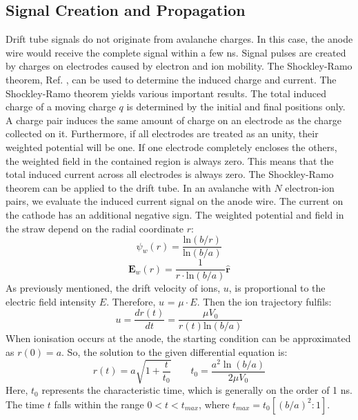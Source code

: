 \subsection{Signal Creation and Propagation}
Drift tube signals do not originate from avalanche charges. In this case, the anode wire would 
receive the complete signal within a few ns. Signal pulses are created by charges on electrodes 
caused by electron and ion mobility. The Shockley-Ramo theorem, Ref. \cite{kola}, can be 
used to determine the induced charge and current. 
The Shockley-Ramo theorem yields various important results. The total induced charge of a moving charge 
$q$ is determined by the initial and final positions only.  A charge pair induces the same amount of 
charge on an electrode as the charge collected on it. Furthermore, if all electrodes are treated as 
an unity, their weighted potential will be one. 
If one electrode completely encloses the others, the weighted field in the contained region is always zero. 
This means that the total induced current across all electrodes is always zero. The Shockley-Ramo theorem can 
be applied to the drift tube. In an avalanche with $N$ electron-ion pairs, we evaluate the induced current 
signal on the anode wire. The current on the cathode has an additional negative sign. The weighted 
potential and field in the straw depend on the radial coordinate $r$:
\begin{equation}
    \psi_w(r)=\frac{\text{ln}(b/r)}{\text{ln}(b/a)}
\end{equation}
\begin{equation}
    \textbf{E}_w(r)=\frac{1}{r \cdot \text{ln}(b/a)}\hat{\textbf{r}}
\end{equation}
As previously mentioned, the drift velocity of ions, $u$, is proportional to the electric field intensity $E$. Therefore, $u$ = $\mu \cdot E$. 
Then the ion trajectory fulfils:
\begin{equation}
    u=\frac{dr(t)}{dt}=\frac{\mu V_0}{r(t)\text{ln}(b/a)}
\end{equation}
When ionisation occurs at the anode, the starting condition can be approximated as $r(0) = a$. So, the solution to the given differential equation is:
 \begin{equation}
    r(t)=a \sqrt{1+\frac{t}{t_0}} \qquad t_0=\frac{a^2 \ln (b / a)}{2 \mu V_0}
    \end{equation}
Here, $t_0$ represents the characteristic time, which is generally on the order of 1 ns. 
The time $t$ falls within the range $0 < t < t_{max}$, where $t_{max} = t_0 [(b/a)^2: 1]$. 
